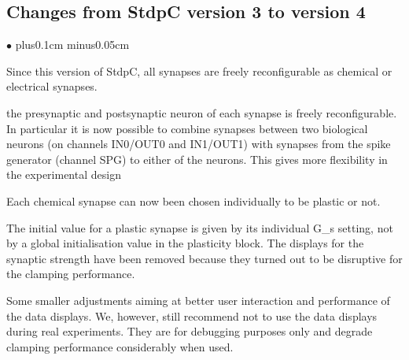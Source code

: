 \documentclass{article}
\newenvironment{myitem}{\begin{list}{$\bullet$}{\setlength{\leftmargin}{1.1em}
\itemsep0.1cm plus0.1cm minus0.05cm
\listparindent0cm
\addtolength{\labelsep}{0.5\labelsep}
\setlength{\labelwidth}{0.8em}
\setlength{\leftmargin}{\labelwidth}
\addtolength{\leftmargin}{\labelsep}
}}{\end{list}}
\begin{document}
\subsection{Changes from StdpC version 3 to version 4}
\begin{myitem}
\item Since this version of StdpC, all synapses are freely reconfigurable as
  chemical or electrical synapses.
\item the presynaptic and postsynaptic neuron of each synapse is freely
  reconfigurable. In particular it is now possible to combine synapses
  between two biological neurons (on channels IN0/OUT0  and IN1/OUT1) with
  synapses from 
  the spike generator (channel SPG) to either of the neurons. This gives more
  flexibility in the experimental design
\item Each chemical synapse can now been chosen individually to be plastic or not.
\item The initial value for a plastic synapse is given by its individual G\_s
  setting, not by a global initialisation value in the plasticity block. The
  displays for the synaptic strength have been removed because they turned
  out to be disruptive for the clamping performance.
\item Some smaller adjustments aiming at better user interaction and
  performance of the data displays. We, however, still recommend not to use
  the data displays during real experiments. They are for debugging purposes
  only and degrade clamping performance considerably when used.
\end{myitem}
\end{document}
